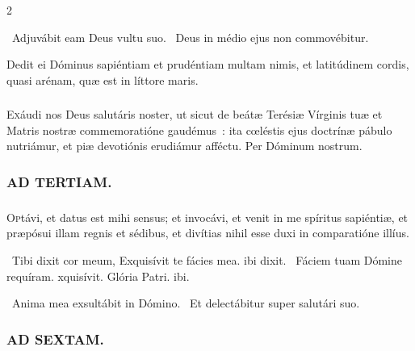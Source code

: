 \documentclass[9pt,twoside]{extarticle}
\begin{document}
\begin{multicols}{2}
{\begin{tightlist}{}
\item {}~Adjuvábit eam Deus vultu suo. ~Deus in médio ejus non commovébitur.
\item {} Dedit ei Dóminus sapiéntiam et prudéntiam multam nimis, et latitúdinem cordis, quasi arénam, quæ est in líttore maris.
\end{tightlist}

\subsubsection*{\center {}}
\lettrine{E}xáudi nos Deus salutáris noster, ut sicut de beátæ Terésiæ Vírginis tuæ et Matris nostræ commemoratióne gaudémus~: ita cœléstis ejus doctrínæ pábulo nutriámur, et piæ devotiónis erudiámur afféctu. Per Dóminum nostrum.

\begin{tightlist}{}
\item {}
\end{tightlist}

\subsubsection*{\center \textsc{AD TERTIAM.}}
\subsubsection*{\center {}}
\lettrine{O}ptávi, et datus est mihi sensus; et invocávi, et venit in me spíritus sapiéntiæ, et præpósui illam regnis et sédibus, et divítias nihil esse duxi in comparatióne illíus.

\begin{tightlist}{}
\item {}~Tibi dixit cor meum, \textred{*} Exquisívit te fácies mea. ibi dixit. ~Fáciem tuam Dómine requíram. xquisívit. Glória Patri. ibi.
\item {}~Anima mea exsultábit in Dómino. ~Et delectábitur super salutári suo.
\end{tightlist}

\subsubsection*{\center \textsc{AD SEXTAM.}}
}
\end{multicols}
\end{document}
